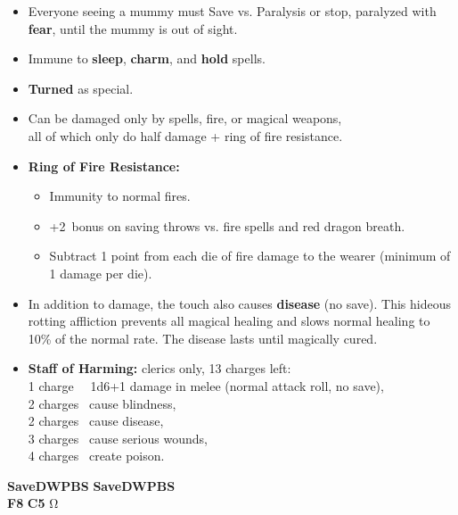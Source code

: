 \documentclass[english,11pt,openany,letterpaper,twocolumn]{book}
\begin{document}
\begin{itemize}[leftmargin=*,label=\itshape\textbullet]
	\item
	Everyone seeing a mummy must Save vs. Paralysis or stop, paralyzed with \textbf{fear}, until the mummy is out of sight.
	\item
	Immune to \textbf{sleep}, \textbf{charm}, and \textbf{hold} spells.
	\item
	\textbf{Turned} as special.
	\item
	Can be damaged only by spells, fire, or magical weapons,\\all of which only do half damage + ring of fire resistance.
	\item
	\textbf{Ring of Fire Resistance:}
	\begin{itemize}[leftmargin=*,label=\bfseries\textbullet]
		\item Immunity to normal fires.
		\item +2~bonus on saving throws vs. fire spells and red dragon breath.
		\item Subtract 1 point from each die of fire damage to the wearer (minimum of 1 damage per die).
	\end{itemize}
	\item
	In addition to damage, the touch also causes \textbf{disease} (no save). This hideous rotting affliction prevents all magical healing and slows normal healing to 10\% of the normal rate. The disease lasts until magically cured.
	\item
	\textbf{Staff of Harming:} clerics only, 13 charges left:\\
		1 charge ~\dash\ 1d6+1 damage in melee (normal attack roll, no save),\\
		2 charges \dash\ cause blindness,\\
		2 charges \dash\ cause disease,\\
		3 charges \dash\ cause serious wounds,\\
		4 charges \dash\ create poison.\\
\end{itemize}

\vfill


\tab
\overprintw[24\charwidth]{\_}%
\textbf{Save\tab D\tab W\tab P\tab B\tab S}\tab
\overprintw[24\charwidth]{\_}%
\textbf{Save\tab D\tab W\tab P\tab B\tab S}\\

\tab\textbf{F8}
\tab\textbf{C5}
\hfill Ω

\end{document}
